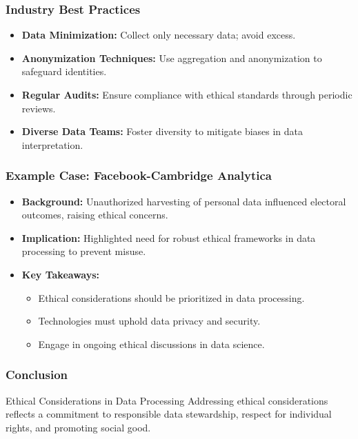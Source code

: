 \documentclass[aspectratio=169]{beamer}
\begin{document}
\begin{frame}[fragile]
    \frametitle{Industry Best Practices}
    
    \begin{itemize}
        \item \textbf{Data Minimization:} Collect only necessary data; avoid excess.
        \item \textbf{Anonymization Techniques:} Use aggregation and anonymization to safeguard identities.
        \item \textbf{Regular Audits:} Ensure compliance with ethical standards through periodic reviews.
        \item \textbf{Diverse Data Teams:} Foster diversity to mitigate biases in data interpretation.
    \end{itemize}
\end{frame}

\begin{frame}[fragile]
    \frametitle{Example Case: Facebook-Cambridge Analytica}
    
    \begin{itemize}
        \item \textbf{Background:} Unauthorized harvesting of personal data influenced electoral outcomes, raising ethical concerns.
        
        \item \textbf{Implication:} Highlighted need for robust ethical frameworks in data processing to prevent misuse.
        
        \item \textbf{Key Takeaways:}
        \begin{itemize}
            \item Ethical considerations should be prioritized in data processing.
            \item Technologies must uphold data privacy and security.
            \item Engage in ongoing ethical discussions in data science.
        \end{itemize}
    \end{itemize}
\end{frame}

\begin{frame}[fragile]
    \frametitle{Conclusion}
    
    \begin{block}{Ethical Considerations in Data Processing}
        Addressing ethical considerations reflects a commitment to responsible data stewardship, respect for individual rights, and promoting social good.
    \end{block}
\end{frame}
\end{document}
